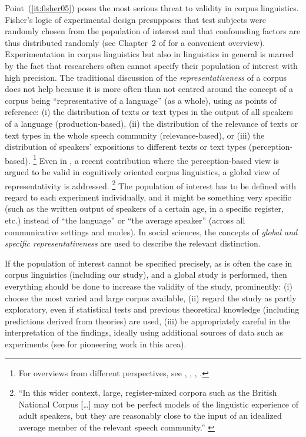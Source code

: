 Point~(\ref{it:fisher05}) poses the most serious threat to validity in corpus linguistics.
Fisher's logic of experimental design presupposes that test subjects were randomly chosen from the population of interest and that confounding factors are thus distributed randomly (see Chapter~2 of \citealt{MaxwellDelaney2004} for a convenient overview).
Experimentation in corpus linguistics but also in linguistics in general is marred by the fact that researchers often cannot specify their population of interest with high precision.
The traditional discussion of the \textit{representativeness} of a corpus does not help because it is more often than not centred around the concept of a corpus being ``representative of a language'' (as a whole), using as points of reference:
(i) the distribution of texts or text types in the output of all speakers of a language (production-based),
(ii) the distribution of the relevance of texts or text types in the whole speech community (relevance-based), or
(iii) the distribution of speakers' expositions to different texts or text types (perception-based).%
\footnote{For overviews from different perspectives, see \textcite{Biber1993}, \textcite{MceneryEa2006}, \textcite{Leech2007}, \textcite{Hunston2008}.}
Even in \textcite{StefanowitschFlach2016}, a recent contribution where the perception-based view is argued to be valid in cognitively oriented corpus linguistics, a global view of representativity is addressed.%
\footnote{``In this wider context, large, register-mixed corpora such as the British National Corpus [\ldots] may not be perfect models of the linguistic experience of adult speakers, but they are reasonably close to the input of an idealized average member of the relevant speech community.'' \parencite[104]{StefanowitschFlach2016}}
The population of interest has to be defined with regard to each experiment individually, and it might be something very specific (such as the written output of speakers of a certain age, in a specific register, etc.) instead of ``the language'' or ``the average speaker'' (across all communicative settings and modes).
In social sciences, the concepts of \textit{global and specific representativeness} \citep[86]{Bortz2005} are used to describe the relevant distinction.

If the population of interest cannot be specified precisely, as is often the case in corpus linguistics (including our study), and a global study is performed, then everything should be done to increase the validity of the study, prominently:
(i) choose the most varied and large corpus available,
(ii) regard the study as partly exploratory, even if statistical tests and previous theoretical knowledge (including predictions derived from theories) are used,
(iii) be appropriately careful in the interpretation of the findings, ideally using additional sources of data such as experiments (see \citealt{BresnanEa2007} for pioneering work in this area).

